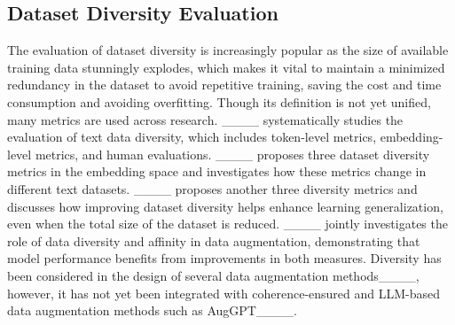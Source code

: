 \subsection{Dataset Diversity Evaluation}
\vspace{-0.1cm}
The evaluation of dataset diversity is increasingly popular as the size of available training data stunningly explodes, which makes it vital to maintain a minimized redundancy in the dataset to avoid repetitive training, saving the cost and time consumption and avoiding overfitting. 
Though its definition is not yet unified, many metrics are used across research. %
____ systematically studies the evaluation of text data diversity, which includes token-level metrics, embedding-level metrics, and human evaluations. 
____ proposes three dataset diversity metrics in the embedding space and investigates how these metrics change in different text datasets. 
____ proposes another three diversity metrics and discusses how improving dataset diversity helps enhance learning generalization, even when the total size of the dataset is reduced.
____ jointly investigates the role of data diversity and affinity in data augmentation, demonstrating that model performance benefits from improvements in both measures. 
Diversity has been considered in the design of several data augmentation methods____, however, it has not yet been integrated with coherence-ensured and LLM-based data augmentation methods such as AugGPT____.